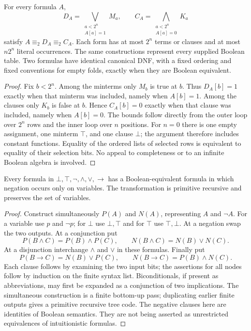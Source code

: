 \begin{theorem}\label{ca-canonical}
For every formula $A$,
\[
 D_A=\bigvee_{\substack{a<2^n\\ A[a]=1}}M_a,
 \qquad
 C_A=\bigwedge_{\substack{a<2^n\\ A[a]=0}}K_a
\]
satisfy $A\equiv_2D_A\equiv_2C_A$.  Each form has at most $2^n$ terms or
clauses and at most $n2^n$ literal occurrences.  The same constructions
represent every supplied Boolean table.  Two formulas have identical
canonical DNF, with a fixed ordering and fixed conventions for empty folds,
exactly when they are Boolean equivalent.
\end{theorem}
\begin{proof}
Fix $b<2^n$.  Among the minterms only $M_b$ is true at $b$.  Thus $D_A[b]=1$
exactly when that minterm was included, namely when $A[b]=1$.  Among the
clauses only $K_b$ is false at $b$.  Hence $C_A[b]=0$ exactly when that clause
was included, namely when $A[b]=0$.  The bounds follow directly from the
outer loop over $2^n$ rows and the inner loop over $n$ positions.  For $n=0$
there is one empty assignment, one minterm $\top$, and one clause $\bot$;
the argument therefore includes constant functions.  Equality of the ordered
lists of selected rows is equivalent to equality of their selection bits.
No appeal to completeness or to an infinite Boolean algebra is involved.
\end{proof}

\begin{theorem}\label{ca-nnf}
Every formula in $\bot,\top,\neg,\wedge,\vee,\to$ has a Boolean-equivalent
formula in which negation occurs only on variables.  The transformation is
primitive recursive and preserves the set of variables.
\end{theorem}
\begin{proof}
Construct simultaneously $P(A)$ and $N(A)$, representing $A$ and $\neg A$.
For a variable use $p$ and $\neg p$; for $\bot$ use $\bot,\top$ and for
$\top$ use $\top,\bot$.  At a negation swap the two outputs.  At a
conjunction put
\[
 P(B\wedge C)=P(B)\wedge P(C),\qquad
 N(B\wedge C)=N(B)\vee N(C).
\]
At a disjunction interchange $\wedge$ and $\vee$ in these formulas.  Finally
put
\[
 P(B\to C)=N(B)\vee P(C),\qquad
 N(B\to C)=P(B)\wedge N(C).
\]
Each clause follows by examining the two input bits; the assertions for all
nodes follow by induction on the finite syntax list.  Biconditionals, if
present as abbreviations, may first be expanded as a conjunction of two
implications.  The simultaneous construction is a finite bottom-up pass;
duplicating earlier finite outputs gives a primitive recursive tree code.
The negative clauses here are identities of Boolean semantics.  They are
not being asserted as unrestricted equivalences of intuitionistic formulas.
\end{proof}

